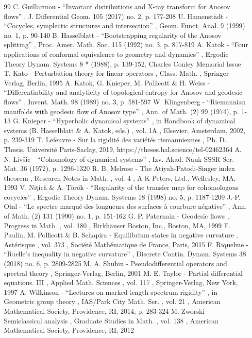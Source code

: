 \begin{thebibliography}{99}
 C. Guillarmou - “Invariant distributions and X-ray transform for Anosov flows” , J. Differential Geom. 105 (2017) no. 2, p. 177-208
 U. Hamenstädt - “Cocycles, symplectic structures and intersection” , Geom. Funct. Anal. 9 (1999) no. 1, p. 90-140
 B. Hasselblatt - “Bootstrapping regularity of the Anosov splitting” , Proc. Amer. Math. Soc. 115 (1992) no. 3, p. 817-819
 A. Katok - “Four applications of conformal equivalence to geometry and dynamics” , Ergodic Theory Dynam. Systems 8 * (1988), p. 139-152, Charles Conley Memorial Issue
 T. Kato - Perturbation theory for linear operators , Class. Math. , Springer-Verlag, Berlin, 1995
 A. Katok, G. Knieper, M. Pollicott \& H. Weiss - “Differentiability and analyticity of topological entropy for Anosov and geodesic flows” , Invent. Math. 98 (1989) no. 3, p. 581-597
 W. Klingenberg - “Riemannian manifolds with geodesic flow of Anosov type” , Ann. of Math. (2) 99 (1974), p. 1-13
 G. Knieper - “Hyperbolic dynamical systems” , in Handbook of dynamical systems (B. Hasselblatt \& A. Katok, eds.) , vol. 1A , Elsevier, Amsterdam, 2002, p. 239-319
 T. Lefeuvre - Sur la rigidité des variétés riemanniennes , Ph. D. Thesis, Université Paris-Saclay, 2019, https://theses.hal.science/tel-02462364
 A. N. Livšic - “Cohomology of dynamical systems” , Izv. Akad. Nauk SSSR Ser. Mat. 36 (1972), p. 1296-1320
 R. B. Melrose - The Atiyah-Patodi-Singer index theorem , Research Notes in Math. , vol. 4 , A K Peters, Ltd., Wellesley, MA, 1993
 V. Niţică \& A. Török - “Regularity of the transfer map for cohomologous cocycles” , Ergodic Theory Dynam. Systems 18 (1998) no. 5, p. 1187-1209
 J.-P. Otal - “Le spectre marqué des longueurs des surfaces à courbure négative” , Ann. of Math. (2) 131 (1990) no. 1, p. 151-162
 G. P. Paternain - Geodesic flows , Progress in Math. , vol. 180 , Birkhäuser Boston, Inc., Boston, MA, 1999
 F. Paulin, M. Pollicott \& B. Schapira - Equilibrium states in negative curvature , Astérisque , vol. 373 , Société Mathématique de France, Paris, 2015
 F. Riquelme - “Ruelle’s inequality in negative curvature” , Discrete Contin. Dynam. Systems 38 (2018) no. 6, p. 2809-2825
 M. A. Shubin - Pseudodifferential operators and spectral theory , Springer-Verlag, Berlin, 2001
 M. E. Taylor - Partial differential equations. III , Applied Math. Sciences , vol. 117 , Springer-Verlag, New York, 1997
 A. Wilkinson - “Lectures on marked length spectrum rigidity” , in Geometric group theory , IAS/Park City Math. Ser. , vol. 21 , American Mathematical Society, Providence, RI, 2014, p. 283-324
 M. Zworski - Semiclassical analysis , Graduate Studies in Math. , vol. 138 , American Mathematical Society, Providence, RI, 2012
\end{thebibliography}

